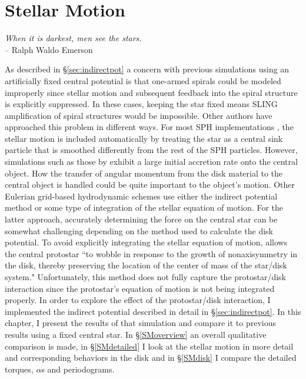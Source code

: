 \chapter{Stellar Motion}\label{chap:indirect}
\thispagestyle{plain}
\begin{spacing}{0.9}
\begin{flushright}
{\it \footnotesize When it is darkest, men see the stars.\\}
 {\small -- Ralph Waldo Emerson}
\end{flushright}
\end{spacing}
As described in \S\ref{sec:indirectpot} a concern with previous simulations using an artificially fixed central potential is that one-armed spirals could be modeled improperly since stellar motion and subsequent feedback into the spiral structure is explicitly suppressed. In these cases, keeping the star fixed means SLING amplification \citep{adams1989,shu1990} of spiral structures would be impossible. Other authors have approached this problem in different ways. For most SPH implementations \citep{rice2003b,mayer2004}, the stellar motion is included automatically by treating the star as a central sink particle that is smoothed differently from the rest of the SPH particles. However, simulations such as those by \citet{rice2003a} exhibit a large initial accretion rate onto the central object. How the transfer of angular momentum from the disk material to the central object is handled could be quite important to the object's motion. Other Eulerian grid-based hydrodynamic schemes use either the indirect potential method or some type of integration of the stellar equation of motion. For the latter approach, accurately determining the force on the central star can be somewhat challenging depending on the method used to calculate the disk potential. To avoid explicitly integrating the stellar equation of motion, \citet{boss2000} allows the central protostar ``to wobble in response to the growth of nonaxisymmetry in the disk, thereby preserving the location of the center of mass of the star/disk system." Unfortunately, this method does not fully capture the protostar/disk interaction since the protostar's equation of motion is not being integrated properly. In order to explore the effect of the protostar/disk interaction, I implemented the indirect potential described in detail in \S\ref{sec:indirectpot}.  In this chapter, I present the results of that simulation and compare it to previous results using a fixed central star. In \S\ref{SMoverview} an overall qualitative comparison is made, in \S\ref{SMdetailed} I look at the stellar motion in more detail and corresponding behaviors in the disk and in \S\ref{SMdisk} I compare the detailed torques, $\alpha$s and periodograms. 

